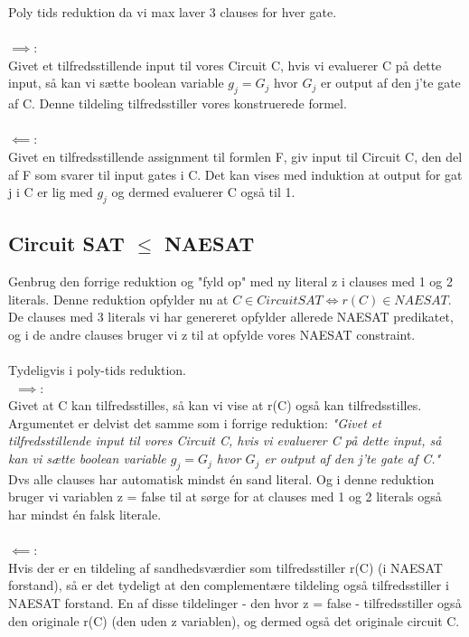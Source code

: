 \documentclass{article}
\begin{document}
Poly tids reduktion da vi max laver 3 clauses for hver gate.\\\\
$\implies$: \\
Givet et tilfredsstillende input til vores Circuit C, hvis vi evaluerer C på dette input, så kan vi sætte boolean variable $g_j = G_j$ hvor $G_j$ er output af den j'te gate af C. Denne tildeling tilfredsstiller vores konstruerede formel.\\\\
$\impliedby$: \\
Givet en tilfredsstillende assignment til formlen F, giv input til Circuit C, den del af F som svarer til input gates i C. Det kan vises med induktion at output for gat j i C er lig med $g_j$ og dermed evaluerer C også til 1.
\subsection{Circuit SAT $\le$ NAESAT}
Genbrug den forrige reduktion og "fyld op" med ny literal z i clauses med 1 og 2 literals. Denne reduktion opfylder nu at $C \in CircuitSAT \iff r(C) \in NAESAT$. De clauses med 3 literals vi har genereret opfylder allerede NAESAT predikatet, og i de andre clauses bruger vi z til at opfylde vores NAESAT constraint. \\\\
Tydeligvis i poly-tids reduktion.\\\
$\implies$: \\
Givet at C kan tilfredsstilles, så kan vi vise at r(C) også kan tilfredsstilles.
Argumentet er delvist det samme som i forrige reduktion: \textit{"Givet et tilfredsstillende input til vores Circuit C, hvis vi evaluerer C på dette input, så kan vi sætte boolean variable $g_j = G_j$ hvor $G_j$ er output af den j'te gate af C."}
Dvs alle clauses har automatisk mindst én sand literal. Og i denne reduktion bruger vi variablen z = false til at sørge for at clauses med 1 og 2 literals også har mindst én  falsk literale.\\\\
$\impliedby$: \\
Hvis der er en tildeling af sandhedsværdier som tilfredsstiller r(C) (i NAESAT forstand), så er det tydeligt at den complementære tildeling også tilfredsstiller i NAESAT forstand. En af disse tildelinger - den hvor z = false - tilfredsstiller også den originale r(C) (den uden z variablen), og dermed også det originale circuit C. \\\\
\end{document}

